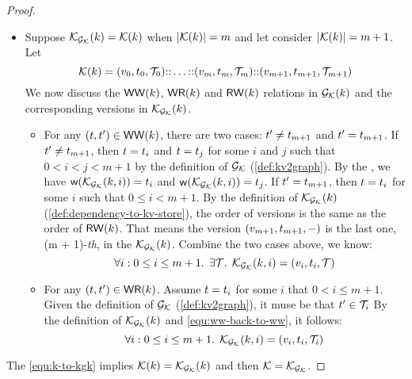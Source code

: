 \begin{proof}
\begin{itemize}
    \item {}
Suppose \( \mathcal{K}_{\mathcal{G}_{\mathcal{K}}}(k) = \mathcal{K}(k) \) when \( |\mathcal{K}(k)| = m \) and let consider  \( |\mathcal{K}(k)| = m + 1 \).
Let 
\[
\mathcal{K}(k) = (v_0, t_0, \mathcal{T}_0 ) \mathbb{::} \dots \mathbb{::} (v_m, t_m, \mathcal{T}_m ) \mathbb{::} (v_{m+1}, t_{m+1}, \mathcal{T}_{m+1} ) 
\]
We now discuss the \( \mathsf{WW}(k) \), \( \mathsf{WR}(k) \) and \( \mathsf{RW}(k) \) relations in \( \mathcal{G}_{\mathcal{K}}(k) \) and the corresponding versions in \( \mathcal{K}_{\mathcal{G}_{\mathcal{K}}}(k) \).
\begin{itemize}
    \item For any \( (t, t') \in \mathsf{WW}(k) \), there are two cases: \( t' \neq t_{m+1} \) and \( t' = t_{m+1} \).
    If \( t' \neq t_{m+1} \), then \( t = t_i \) and \( t = t_j \) for some \( i \) and \( j \) such that \( 0 < i < j < m + 1 \) by the definition of \( \mathcal{G}_{\mathcal{K}} \) (\cref{def:kv2graph}).
    By the \ih, we have \( \wtOf(\mkvs_{\Gr_\mkvs}(\key,i))  = \txid_i \) and \( \wtOf(\mkvs_{\Gr_\mkvs}(\key,i))  = \txid_j \).
    If \( t' = t_{m + 1} \), then \( t = t_i \) for some \( i \) such that \( 0 \leq i < m + 1 \).
    By the definition of  \( \mathcal{K}_{\mathcal{G}_{\mathcal{K}}}(k) \) (\cref{def:dependency-to-kv-store}), the order of versions is the same as the order of \( \mathsf{RW}(k) \).
    That means the version \( (v_{m+1}, t_{m+1}, - ) \) is the last one, \ie (m + 1)-\emph{th}, in the \( \mathcal{K}_{\mathcal{G}_{\mathcal{K}}}(k) \).
    Combine the two cases above, we know:
    \begin{equation}
        \label{equ:ww-back-to-ww}
        \forall i : 0 \leq i \leq m + 1 \ldotp \; \exists \mathcal{T} \ldotp \; \mathcal{K}_{\mathcal{G}_{\mathcal{K}}}(k, i) = (v_i, t_i, \mathcal{T})
    \end{equation}
    
    \item For any \( (t, t' ) \in \mathsf{WR}(k) \).
    Assume \( t = t_i \) for some \( i \) that \( 0 < i \leq m + 1\).
    Given the definition of \( \mathcal{G}_{\mathcal{K}} \) (\cref{def:kv2graph}), it muse be that \( t' \in \mathcal{T}_i \)
    By the definition of  \( \mathcal{K}_{\mathcal{G}_{\mathcal{K}}}(k) \) and \cref{equ:ww-back-to-ww}, it follows:
    \begin{equation}
        \label{equ:k-to-kgk}
        \forall i : 0 \leq i \leq m + 1 \ldotp \; \mathcal{K}_{\mathcal{G}_{\mathcal{K}}}(k, i) = (v_i, t_i, \mathcal{T}_i)
    \end{equation}
\end{itemize}
\end{itemize}
The \cref{equ:k-to-kgk} implies \( \mathcal{K}(k) = \mathcal{K}_{\mathcal{G}_{\mathcal{K}}}(k) \) and then \( \mathcal{K} = \mathcal{K}_{\mathcal{G}_{\mathcal{K}}} \).
\end{proof}
